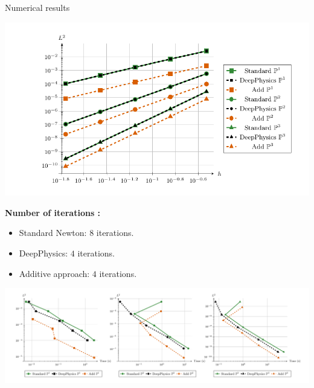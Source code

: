 \begin{frame}{Numerical results}	
    \vspace{-10pt}
    \begin{center}
        \begin{minipage}{0.58\linewidth}
            \includegraphics[width=\linewidth]{images/newlines/nonlinear/results/cvg_cropped.pdf}
        \end{minipage}
        \begin{minipage}{0.38\linewidth}
            \small
            \textbf{Number of iterations :}

            \begin{itemize}
                \item Standard Newton: $8$ iterations.
                \item DeepPhysics: $4$ iterations.
                \item Additive approach: $4$ iterations.
            \end{itemize}
        \end{minipage}
        
        \vspace{-10pt}
        \includegraphics[width=\linewidth]{images/newlines/nonlinear/results/times_cropped.pdf}
    \end{center}
\end{frame}